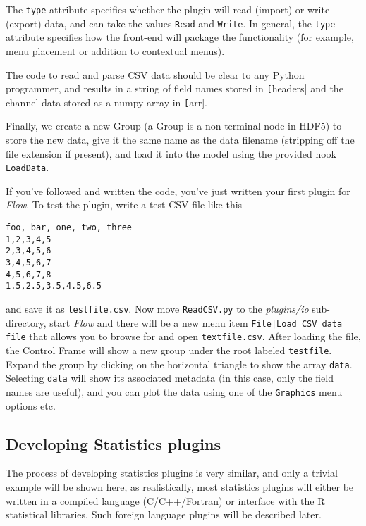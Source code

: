 \documentclass{article}
\begin{document}
The \texttt{type} attribute specifies whether the plugin will read
(import) or write (export) data, and can take the values \texttt{Read}
and \texttt{Write}. In general, the \texttt{type} attribute specifies
how the front-end will package the functionality (for example, menu
placement or addition to contextual menus).

The code to read and parse CSV data should be clear to any Python
programmer, and results in a string of field names stored in
\texttt[headers] and the channel data stored as a numpy array in
\texttt[arr].

Finally, we create a new Group (a Group is a non-terminal node in
HDF5) to store the new data, give it the same name as the data
filename (stripping off the file extension if present), and load it
into the model using the provided hook \texttt{LoadData}.

If you've followed and written the code, you've just written your
first plugin for \emph{Flow}. To test the plugin, write a test CSV
file like this

\begin{verbatim}
foo, bar, one, two, three
1,2,3,4,5
2,3,4,5,6
3,4,5,6,7
4,5,6,7,8
1.5,2.5,3.5,4.5,6.5
\end{verbatim}

and save it as \texttt{testfile.csv}. Now move \texttt{ReadCSV.py} to
the \emph{plugins/io} sub-directory, start \emph{Flow} and there will
be a new menu item \texttt{File|Load CSV data file} that allows you to
browse for and open \texttt{textfile.csv}. After loading the file, the
Control Frame will show a new group under the root labeled
\texttt{testfile}. Expand the group by clicking on the horizontal
triangle to show the array \texttt{data}. Selecting \texttt{data} will
show its associated metadata (in this case, only the field names are
useful), and you can plot the data using one of the \texttt{Graphics}
menu options etc.

\subsection*{Developing Statistics plugins}

The process of developing statistics plugins is very similar, and only
a trivial example will be shown here, as realistically, most
statistics plugins will either be written in a compiled language
(C/C++/Fortran) or interface with the R statistical libraries. Such
foreign language plugins will be described later.
\end{document}
